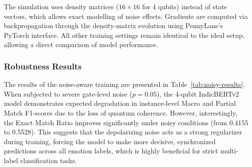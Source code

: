 \documentclass[runningheads]{llncs}
\begin{document}
The simulation uses density matrices ($16 \times 16$ for 4
qubits) instead of state vectors, which allows exact modelling
of noise effects. Gradients are computed via backpropagation
through the density-matrix evolution using PennyLane's PyTorch
interface. All other training settings remain identical to the
ideal setup, allowing a direct comparison of model performance.

\subsubsection{Robustness Results}

The results of the noise-aware training are presented in 
Table~\ref{tab:noisy-results}. When subjected to severe gate-level 
noise ($p=0.05$), the 4-qubit IndicBERTv2 model demonstrates 
expected degradation in instance-level Macro and Partial Match 
F1-scores due to the loss of quantum coherence. However, interestingly, 
the Exact Match Ratio improves significantly under noisy conditions 
(from 0.4155 to 0.5528). This suggests that the depolarizing noise 
acts as a strong regularizer during training, forcing the model to 
make more decisive, synchronized predictions across all emotion labels, 
which is highly beneficial for strict multi-label classification tasks.

\begin{table}[htbp]
  \centering
  \caption{Performance comparison of the 4-qubit IndicBERTv2 model under ideal (noiseless) and noisy ($p=0.05$) simulated environments.}
  \label{tab:noisy-results}
\end{table}
\end{document}

